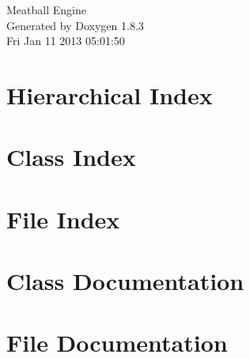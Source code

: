 \documentclass{book}
\begin{document}
\hypersetup{pageanchor=false,citecolor=blue}
\begin{titlepage}
\vspace*{7cm}
\begin{center}
{\Large Meatball Engine }\\
\vspace*{1cm}
{\large Generated by Doxygen 1.8.3}\\
\vspace*{0.5cm}
{\small Fri Jan 11 2013 05:01:50}\\
\end{center}
\end{titlepage}
\clearemptydoublepage
{}
\tableofcontents
\clearemptydoublepage
{}
\hypersetup{pageanchor=true,citecolor=blue}
\chapter{Hierarchical Index}

\chapter{Class Index}

\chapter{File Index}

\chapter{Class Documentation}












\chapter{File Documentation}
























\printindex
\end{document}
